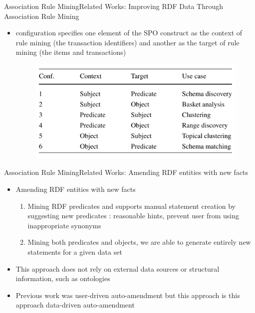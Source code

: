 \documentclass[10pt]{beamer}
\begin{document}
\begin{frame}{Association Rule Mining}{Related Works:  Improving RDF Data Through Association Rule Mining}

\begin{itemize}
\item configuration specifies one element of the SPO construct as the context of rule mining (the transaction identifiers) and another as the target of rule mining (the items and transactions)

\begin{figure} 
	\includegraphics[width=.6\linewidth]{images/rule-config.PNG}
\end{figure}


\end{itemize}
\end{frame}

\begin{frame}{Association Rule Mining}{Related Works:  Amending RDF entities with new facts}
\begin{itemize}
\item Amending RDF entities with new facts \cite{abedjan2014amending}
	\begin{enumerate}
		\item Mining RDF predicates and supports manual statement creation by suggesting new predicates : reasonable hints, prevent user from using inappropriate synonyms 
		\item Mining both predicates and objects, we are able to generate entirely new statements for a given data set
	 

	\end{enumerate}
	\item This approach does not rely on external data sources or structural information, such as ontologies
	\item  Previous work \cite{abedjan2013improving} was user-driven auto-amendment but this approach is this approach data-driven auto-amendment
\end{itemize}
\end{frame}
\end{document}
